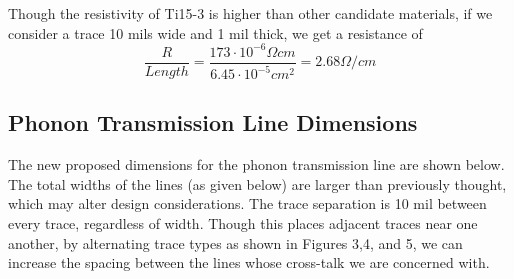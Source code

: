 \documentclass{report}
\begin{document}
Though the resistivity of Ti15-3 is higher than other candidate materials, if we consider a trace 10 mils wide and 1 mil thick, we get a resistance of
$$
\frac{R}{Length} = \frac{173 \cdot 10^{-6} \Omega cm}{6.45 \cdot 10^{-5} cm^{2}} = 2.68 \Omega / cm
$$

\subsection{Phonon Transmission Line Dimensions}

The new proposed dimensions for the phonon transmission line are shown below. The total widths of the lines (as given below) are larger than previously thought, which may alter design considerations. The trace separation is 10 mil between every trace, regardless of width. Though this places adjacent traces near one another, by alternating trace types as shown in Figures 3,4, and 5, we can increase the spacing between the lines whose cross-talk we are concerned with.
\end{document}

